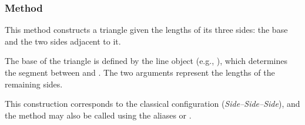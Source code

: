 \begin{minipage}{.35\textwidth}
\begin{center}
\end{center}
\end{minipage}
\begin{minipage}{.65\textwidth}
\begin{tkzexample}
\end{tkzexample}
\end{minipage}

\subsubsection{Method }
\label{ssub:triangle_with_three_given_sides}

This method constructs a triangle given the lengths of its three sides: the base and the two sides adjacent to it.

\medskip
\noindent
The base of the triangle is defined by the line object (e.g., ), which determines the segment between  and . The two arguments  represent the lengths of the remaining sides.

\medskip
\noindent
This construction corresponds to the classical  configuration (\textit{Side–Side–Side}), and the method may also be called using the aliases  or .

\vspace{1em}

